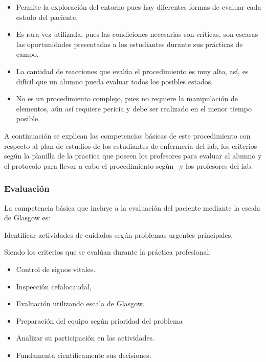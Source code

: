 \begin{itemize}
\item Permite la exploración del entorno pues hay diferentes formas de evaluar cada
    estado del paciente.
\item Es rara vez utilizada, pues las condiciones necesarias son críticas, son
    escasas las oportunidades presentadas a los estudiantes durante sus
    prácticas de campo. 
\item La cantidad de reacciones que evalúa el procedimiento es muy alto,
    así, es difícil que un alumno pueda evaluar todos los posibles estados.
\item No es un procedimiento complejo, pues no requiere la manipulación de
    elementos, aún así requiere pericia y debe ser realizado en el menor tiempo
    posible.
\end{itemize}

A continuación se explican las competencias básicas de este procedimiento con
respecto al plan de estudios de los estudiantes de enfermería del \Gls{iab}, los
criterios según la planilla de la practica que poseen los profesores para
evaluar al alumno y el protocolo para llevar a cabo el procedimiento
según~\cite{protocolo} y los profesores del \Gls{iab}.

\subsubsection{Evaluación}

La competencia básica que incluye a la evaluación del paciente mediante la
escala de Glasgow es:

\begin{displayquote}
Identificar actividades de cuidados según problemas urgentes principales.
\end{displayquote}

Siendo los criterios que se evalúan durante la práctica profesional:

\begin{itemize}
\item Control de signos vitales.
\item Inspección cefalocaudal, 
\item Evaluación utilizando escala de Glasgow.
\item Preparación del equipo según prioridad del problema
\item Analizar su participación en las actividades.
\item Fundamenta científicamente sus decisiones.
\end{itemize}

